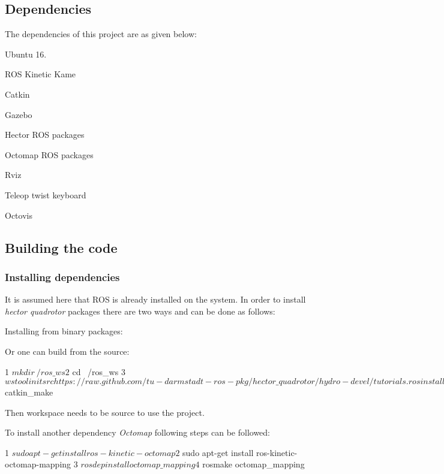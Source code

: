 \subsection*{\label{_dependencies}%
 Dependencies}

The dependencies of this project are as given below\+:
\begin{DoxyItemize}
\item Ubuntu 16.
\item R\+OS Kinetic Kame
\item Catkin
\item Gazebo
\item Hector R\+OS packages
\item Octomap R\+OS packages
\item Rviz
\item Teleop twist keyboard
\item Octovis
\end{DoxyItemize}

\subsection*{\label{_building}%
 Building the code}

\subsubsection*{\label{_install-dependencies}%
 Installing dependencies}

It is assumed here that R\+OS is already installed on the system. In order to install {\itshape hector quadrotor} packages there are two ways and can be done as follows\+:

Installing from binary packages\+: 


Or one can build from the source\+: 
\begin{DoxyCode}
1 $ mkdir ~/ros\_ws
2 $ cd ~/ros\_ws
3 $ wstool init src
       https://raw.github.com/tu-darmstadt-ros-pkg/hector\_quadrotor/hydro-devel/tutorials.rosinstall
4 $ catkin\_make 
\end{DoxyCode}


Then workspace needs to be source to use the project.

To install another dependency {\itshape Octomap} following steps can be followed\+: 
\begin{DoxyCode}
1 $ sudo apt-get install ros-kinetic-octomap
2 $ sudo apt-get install ros-kinetic-octomap-mapping 
3 $ rosdep install octomap\_mapping 
4 $ rosmake octomap\_mapping
\end{DoxyCode}


